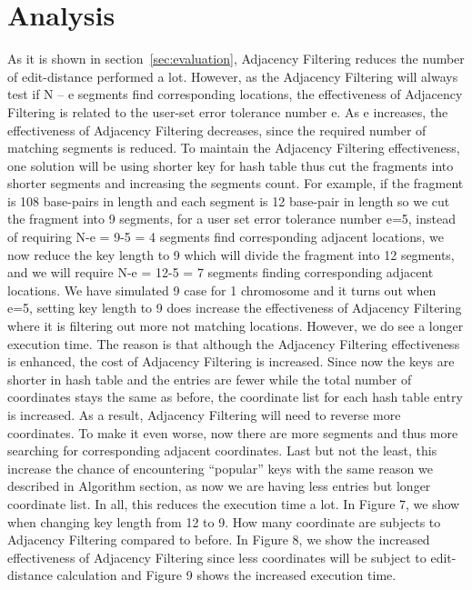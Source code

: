 \section{Analysis} \label{sec:analysis} 

As it is shown in section~\ref{sec:evaluation}, Adjacency Filtering reduces the
number of edit-distance performed a lot.  However, as the Adjacency Filtering
will always test if N – e segments find corresponding locations, the
effectiveness of Adjacency Filtering is related to the user-set error tolerance
number e. As e increases, the effectiveness of Adjacency Filtering decreases,
since the required number of matching segments is reduced. To maintain the
Adjacency Filtering effectiveness, one solution will be using shorter key for
hash table thus cut the fragments into shorter segments and increasing the
segments count.  For example, if the fragment is 108 base-pairs in length and
each segment is 12 base-pair in length so we cut the fragment into 9 segments,
for a user set error tolerance number e=5, instead of requiring N-e = 9-5 = 4
segments find corresponding adjacent locations, we now reduce the key length to
9 which will divide the fragment into 12 segments, and we will require N-e =
12-5 = 7 segments finding corresponding adjacent locations. We have simulated 9
case for 1 chromosome and it turns out when e=5, setting key length to 9 does
increase the effectiveness of Adjacency Filtering where it is filtering out
more not matching locations. However, we do see a longer execution time. The
reason is that although the Adjacency Filtering effectiveness is enhanced, the
cost of Adjacency Filtering is increased. Since now the keys are shorter in
hash table and the entries are fewer while the total number of coordinates
stays the same as before, the coordinate list for each hash table entry is
increased. As a result, Adjacency Filtering will need to reverse more
coordinates. To make it even worse, now there are more segments and thus more
searching for corresponding adjacent coordinates. Last but not the least, this
increase the chance of encountering “popular” keys with the same reason we
described in Algorithm section, as now we are having less entries but longer
coordinate list. In all, this reduces the execution time a lot. In Figure 7, we
show when changing key length from 12 to 9. How many coordinate are subjects to
Adjacency Filtering compared to before. In Figure 8, we show the increased
effectiveness of Adjacency Filtering since less coordinates will be subject to
edit-distance calculation and Figure 9 shows the increased execution time. \\ 

